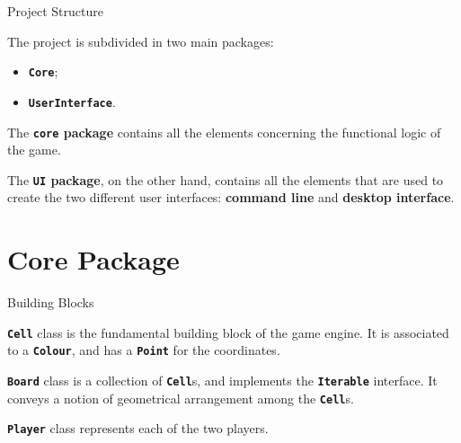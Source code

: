 \documentclass{beamer}
\begin{document}
  \begin{frame}{Project Structure}

    The project is subdivided in two main packages:

    \begin{itemize}
      \item \textbf{\texttt{Core}};
      \item \textbf{\texttt{UserInterface}}.
    \end{itemize}

    \pause

    \vspace{1em}

    The \textbf{\texttt{core} package} contains all the elements concerning the functional logic of the game.

    \pause

    \vspace{1em}

    The \textbf{\texttt{UI} package}, on the other hand, contains all the elements that are used to create the two different user interfaces: \textbf{command line} and \textbf{desktop interface}.

  \end{frame}



\section{Core Package}

  \begin{frame}{Building Blocks}

    \texttt{\textbf{Cell}} class is the fundamental building block of the game engine. It is associated to a \textbf{\texttt{Colour}}, and has a \textbf{\texttt{Point}} for the coordinates.

    \vspace{1em}

    \textbf{\texttt{Board}} class is a collection of \textbf{\texttt{Cell}}s, and implements the \textbf{\texttt{Iterable}} interface. It conveys a notion of geometrical arrangement among the \textbf{\texttt{Cell}}s.

    \vspace{1em}

    \textbf{\texttt{Player}} class represents each of the two players.

  \end{frame}
\end{document}
